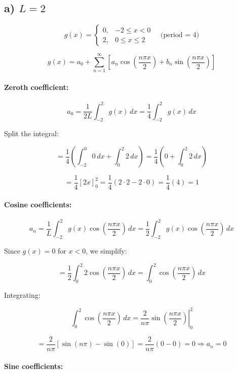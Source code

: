 \documentclass{article}
\begin{document}
\subsection*{a) $L = 2$}

\[
g(x) =
\begin{cases}
0, & -2 \le x < 0 \\
2, & 0 \le x \le 2
\end{cases}
\quad \text{(period = 4)}
\]

\[
g(x) = a_0 + \sum_{n=1}^\infty \left[ a_n \cos\left( \frac{n\pi x}{2} \right) + b_n \sin\left( \frac{n\pi x}{2} \right) \right]
\]

\paragraph{Zeroth coefficient:}

\[
a_0 = \frac{1}{2L} \int_{-2}^{2} g(x)\,dx = \frac{1}{4} \int_{-2}^{2} g(x)\,dx
\]

Split the integral:

\[
= \frac{1}{4} \left( \int_{-2}^{0} 0\,dx + \int_0^2 2\,dx \right)
= \frac{1}{4} \left( 0 + \int_0^2 2\,dx \right)
\]

\[
= \frac{1}{4} \left[ 2x \right]_0^2 = \frac{1}{4} (2 \cdot 2 - 2 \cdot 0)
= \frac{1}{4} (4) = 1
\]

\paragraph{Cosine coefficients:}

\[
a_n = \frac{1}{L} \int_{-2}^{2} g(x) \cos\left( \frac{n\pi x}{2} \right)\,dx
= \frac{1}{2} \int_{-2}^{2} g(x) \cos\left( \frac{n\pi x}{2} \right)\,dx
\]

Since $g(x) = 0$ for $x < 0$, we simplify:

\[
= \frac{1}{2} \int_0^2 2 \cos\left( \frac{n\pi x}{2} \right)\,dx
= \int_0^2 \cos\left( \frac{n\pi x}{2} \right)\,dx
\]

Integrating:

\[
\int_0^2 \cos\left( \frac{n\pi x}{2} \right)\,dx =
\left. \frac{2}{n\pi} \sin\left( \frac{n\pi x}{2} \right) \right|_0^2
\]

\[
= \frac{2}{n\pi} \left[ \sin(n\pi) - \sin(0) \right]
= \frac{2}{n\pi} (0 - 0) = 0
\Rightarrow a_n = 0
\]

\paragraph{Sine coefficients:}
\end{document}
